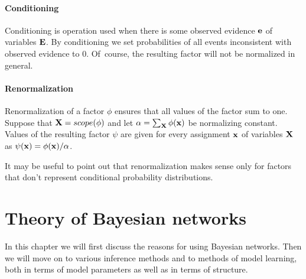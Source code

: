 \documentclass[english,cover]{fitthesis} %
\newcommand{\vars}[1]{{\bold{#1}}}         %
\begin{document}
\subsubsection{Conditioning}
Conditioning is operation used when there is some observed evidence $\vars{e}$ of variables $\vars{E}$. By conditioning we set probabilities of all events inconsistent with observed evidence to 0. Of~course, the resulting factor will not be normalized in general.

\subsubsection{Renormalization}
Renormalization of a factor $\phi$ ensures that all values of the factor sum to one. Suppose that $\vars{X} = scope(\phi)$ and let $\alpha = \sum_\vars{X} \phi(\vars{x})$ be normalizing constant. Values of the resulting factor $\psi$ are given for every assignment $\vars{x}$ of variables $\vars{X}$ as $\psi(\vars{x}) = \phi(\vars{x}) / \alpha$.

It may be useful to point out that renormalization makes sense only for factors that don't represent conditional probability distributions.



































\chapter{Theory of Bayesian networks}\label{ch:bn_theory}
In this chapter we will first discuss the reasons for using Bayesian networks. Then we will move on to various inference methods and to methods of model learning, both in terms of model parameters as well as in terms of structure.
\end{document}
